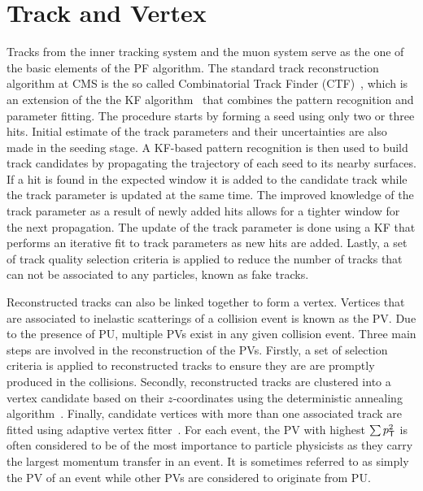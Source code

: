 \section{Track and Vertex}
\label{sec:Track}

Tracks from the inner tracking system and the muon system serve as the one of the basic elements of the \ac{PF} algorithm. The standard track reconstruction algorithm at \ac{CMS} is the so called Combinatorial Track Finder (CTF)~\cite{Speer:2005dp}, which is an extension of the the \ac{KF} algorithm~\cite{Fruhwirth:1987fm} that combines the pattern recognition and parameter fitting. The procedure starts by forming a seed using only two or three hits. Initial estimate of the track parameters and their uncertainties are also made in the seeding stage. A \ac{KF}-based pattern recognition is then used to build track candidates by propagating the trajectory of each seed to its nearby surfaces. If a hit is found in the expected window it is added to the candidate track while the track parameter is updated at the same time. The improved knowledge of the track parameter as a result of newly added hits allows for a tighter window for the next propagation. The update of the track parameter is done using a \ac{KF} that performs an iterative fit to track parameters as new hits are added. Lastly, a set of track quality selection criteria is applied to reduce the number of tracks that can not be associated to any particles, known as fake tracks. 

Reconstructed tracks can also be linked together to form a vertex. Vertices that are associated to inelastic scatterings of a collision event is known as the \ac{PV}. Due to the presence of \ac{PU}, multiple \acp{PV} exist in any given collision event. Three main steps are involved in the reconstruction of the \acp{PV}. Firstly, a set of selection criteria is applied to reconstructed tracks to ensure they are are promptly produced in the collisions. Secondly, reconstructed tracks are clustered into a vertex candidate based on their $z$-coordinates using the deterministic annealing algorithm~\cite{Rose:1998dzq}. Finally, candidate vertices with more than one associated track are fitted using adaptive vertex fitter~\cite{Fruhwirth:2007hz}. For each event, the \ac{PV} with highest $\sum p_{\textsf{T}}^2$ is often considered to be of the most importance to particle physicists as they carry the largest momentum transfer in an event. It is sometimes referred to as simply the \ac{PV} of an event while other \acp{PV} are considered to originate from \ac{PU}.

